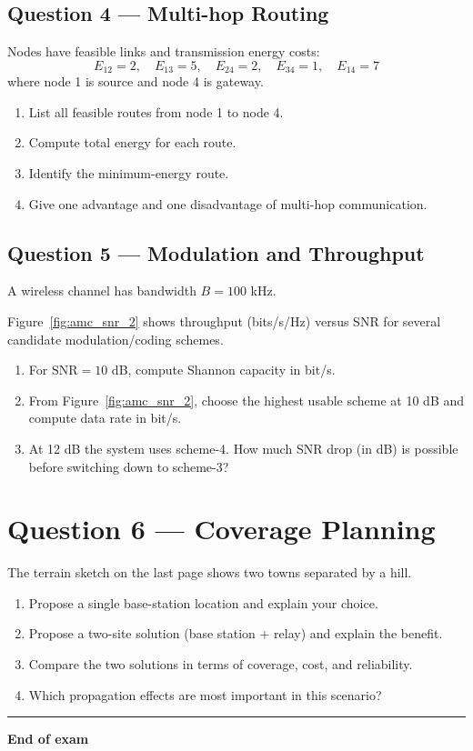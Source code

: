 \documentclass[11pt,a4paper]{article}
\begin{document}
\subsection*{Question 4 --- Multi-hop Routing}
Nodes have feasible links and transmission energy costs:
\[
E_{12}=2,\quad E_{13}=5,\quad E_{24}=2,\quad E_{34}=1,\quad E_{14}=7
\]
where node 1 is source and node 4 is gateway.

\begin{enumerate}[label=\alph*)]
    \item List all feasible routes from node 1 to node 4.
    \item Compute total energy for each route.
    \item Identify the minimum-energy route.
    \item Give one advantage and one disadvantage of multi-hop communication.
\end{enumerate}

\subsection*{Question 5 --- Modulation and Throughput}
A wireless channel has bandwidth $B = 100$ kHz.

Figure~\ref{fig:amc_snr_2} shows throughput (bits/s/Hz) versus SNR for several candidate modulation/coding schemes.

\FloatBarrier

\begin{enumerate}[label=\alph*)]
\item For $\mathrm{SNR}=10$ dB, compute Shannon capacity in bit/s.
\item From Figure~\ref{fig:amc_snr_2}, choose the highest usable scheme at 10 dB and compute data rate in bit/s.
\item At 12 dB the system uses scheme-4. How much SNR drop (in dB) is possible before switching down to scheme-3?
\end{enumerate}

\section*{Question 6 --- Coverage Planning}
The terrain sketch on the last page shows two towns separated by a hill.

\begin{enumerate}[label=\alph*)]
\item Propose a single base-station location and explain your choice.
\item Propose a two-site solution (base station + relay) and explain the benefit.
\item Compare the two solutions in terms of coverage, cost, and reliability.
\item Which propagation effects are most important in this scenario?
\end{enumerate}

\vspace{0.6cm}
\hrule
\vspace{0.3cm}
\textbf{End of exam}


\clearpage
\label{LastPage}
\end{document}
